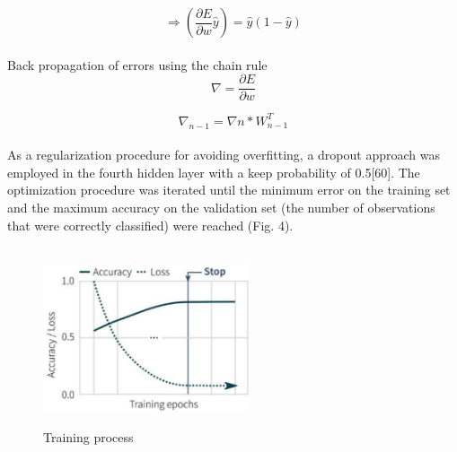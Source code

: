 \documentclass{llncs}       %
\begin{document}
\begin{equation} 
\Rightarrow(\frac{\partial E}{\partial w}\widehat{y})= \widehat{y}(1-\widehat{y})
\end{equation}

\paragraph{}
\paragraph{}Back propagation of errors using the chain rule
\begin{equation} 
\nabla=\frac{\partial E}{\partial w}
\end{equation}

\begin{equation} 
\nabla_{n-1}=\nabla{n}*W^{T}_{n-1}
\end{equation}

\paragraph{}
\paragraph{}
As a regularization procedure for avoiding overfitting, a dropout approach was employed in the fourth hidden layer with a keep probability of 0.5[60]. The optimization procedure was iterated until the minimum error on the training set and the maximum accuracy on the validation set (the number of observations that were correctly classified) were reached (Fig. 4). 
\paragraph{}

\begin{figure}[h]
\centering
\includegraphics[width=6.08cm,height=5.11cm]{media/training-pro.eps}
\caption{ Training process}
\end{figure}
\end{document}

